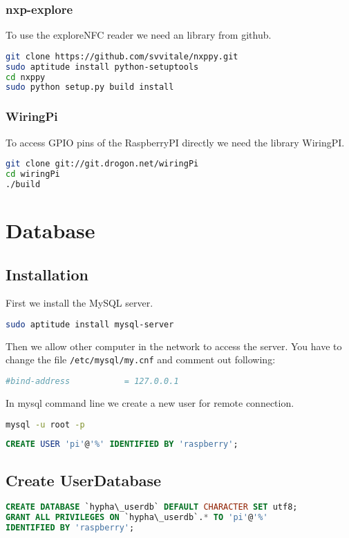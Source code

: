 \documentclass[a4paper,11pt]{report}
\begin{document}
\subsection{nxp-explore}
To use the exploreNFC reader we need an library from github.
\begin{lstlisting}[language=bash,caption={compile install nxp-explore}]
git clone https://github.com/svvitale/nxppy.git
sudo aptitude install python-setuptools
cd nxppy
sudo python setup.py build install
\end{lstlisting}

\subsection{WiringPi}
To access GPIO pins of the RaspberryPI directly we need the library WiringPI.
\begin{lstlisting}[language=bash,caption={install wiringpi}]
git clone git://git.drogon.net/wiringPi
cd wiringPi
./build
\end{lstlisting}

\chapter{Database}
\section{Installation}
First we install the MySQL server.
\begin{lstlisting}[language=bash,caption={mysql-server}]
sudo aptitude install mysql-server
\end{lstlisting}
Then we allow other computer in the network to access the server.
You have to change the file \texttt{/etc/mysql/my.cnf} and comment out following:
\begin{lstlisting}[language=bash,caption={/etc/mysql/my.cnf}]
#bind-address           = 127.0.0.1
\end{lstlisting}

In mysql command line we create a new user for remote connection.

\begin{lstlisting}[language=bash,caption={login to mysql}]
mysql -u root -p
\end{lstlisting}
\begin{lstlisting}[language=sql,caption={create mysql user}]
CREATE USER 'pi'@'%' IDENTIFIED BY 'raspberry';
\end{lstlisting}
\section{Create UserDatabase}
\begin{lstlisting}[language=sql,caption={create userdatabase}]
CREATE DATABASE `hypha\_userdb` DEFAULT CHARACTER SET utf8;
GRANT ALL PRIVILEGES ON `hypha\_userdb`.* TO 'pi'@'%'
IDENTIFIED BY 'raspberry';
\end{lstlisting}
\end{document}
